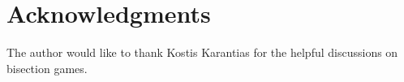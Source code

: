 \section*{Acknowledgments}

The author would like to thank Kostis Karantias for the helpful discussions on bisection games.
